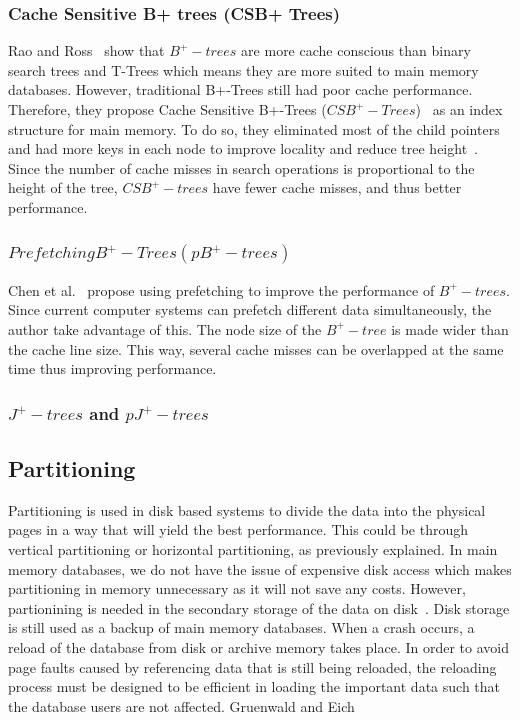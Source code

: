 \documentclass[12pt,a4paper]{article}
\begin{document}
\subsubsection*{Cache Sensitive B+ trees (CSB+ Trees)}

Rao and Ross~\cite{rao1999cache} show that $B^{+}-trees$ are more cache conscious than binary search trees and T-Trees which means they are more suited to main
memory databases. However, traditional B+-Trees still had poor cache performance. Therefore, they propose Cache Sensitive B+-Trees
($CSB^{+}-Trees$)~\cite{rao2000making} as an index structure for main memory. To do so, they eliminated most of the child pointers and had more keys in each
node to improve locality and reduce tree height~\cite{luan2009prefetching}. Since the number of cache misses in search operations is proportional to the height
of the tree, $CSB^{+}-trees$ have fewer cache misses, and thus better performance.


\subsubsection*{$Prefetching B^{+}-Trees (pB^{+}-trees)$}

Chen et al.~\cite{chen2001improving} propose using prefetching to improve the performance of $B^{+}-trees$. Since current computer systems can prefetch
different data simultaneously, the author take advantage of this. The node size of the $B^{+}-tree$ is made wider than the cache line size. This way, several
cache misses can be overlapped at the same time thus improving performance.


\subsubsection*{$J^{+}-trees$ and $pJ^{+}-trees$}

\subsection{Partitioning}

Partitioning is used in disk based systems to divide the data into the physical pages in a way that will yield the best performance. This could be through
vertical partitioning or horizontal partitioning, as previously explained. In main memory databases, we do not have the issue of expensive disk access which
makes partitioning in memory unnecessary as it will not save any costs. However, partionining is needed in the secondary storage of the data on
disk~\cite{gruenwald1990database}. Disk storage is still used as a backup of main memory databases. When a crash occurs, a reload of the database from disk or
archive memory takes place. In order to avoid page faults caused by referencing data that is still being reloaded, the reloading process must be designed to be
efficient in loading the important data such that the database users are not affected. Gruenwald and Eich~\cite{gruenwald1990database,gruenwald1990choosing}
\end{document}
